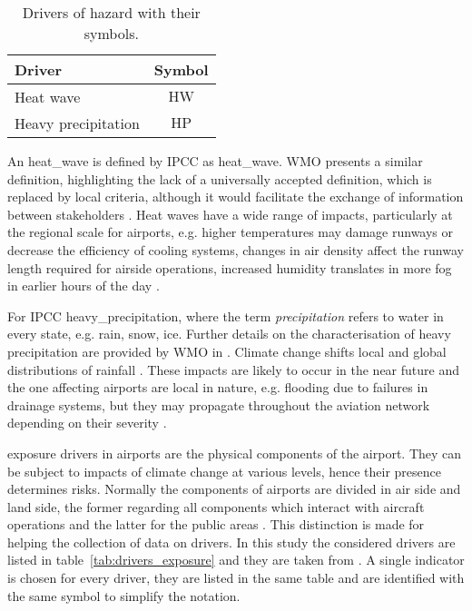 \begin{table}
  \centering
  \caption{Drivers of hazard with their symbols.}
  \label{tab:drivers_hazard}
  \begin{tabular}{lc}
    Driver              & Symbol        \\
    \hline
    Heat wave           & $\mathrm{HW}$ \\
    Heavy precipitation & $\mathrm{HP}$ \\
  \end{tabular}
\end{table}

An \gls{heat_wave} is defined by \gls{IPCC} as \glsdesc{heat_wave}. \Gls{WMO} presents a similar definition, highlighting the lack of a universally accepted definition, which is replaced by local criteria, although it would facilitate the exchange of information between stakeholders \cite[5]{2023WorldMeteorologicalOrganizationWMOGuidelinesOn}. Heat waves have a wide range of impacts, particularly at the regional scale for airports, e.g. higher temperatures may damage runways or decrease the efficiency of cooling systems, changes in air density affect the runway length required for airside operations, increased humidity translates in more fog in earlier hours of the day \cite[23-28]{2018ICAOClimateAdaptation}.

For \gls{IPCC} \glsdesc{heavy_precipitation}, where the term \emph{precipitation} refers to water in every state, e.g. rain, snow, ice. Further details on the characterisation of heavy precipitation are provided by \gls{WMO} in \cite[6-7]{2023WorldMeteorologicalOrganizationWMOGuidelinesOn}. Climate change shifts local and global distributions of rainfall \cite[1605]{2021SeneviratneWeatherAnd}. These impacts are likely to occur in the near future and the one affecting airports are local in nature, e.g. flooding due to failures in drainage systems, but they may propagate throughout the aviation network depending on their severity \cite[28-34]{2018ICAOClimateAdaptation}.

\Gls{exposure} \glspl{driver} in airports are the physical components of the airport. They can be subject to \glspl{impact} of climate change at various levels, hence their presence determines \glspl{risk}. Normally the components of airports are divided in air side and land side, the former regarding all components which interact with aircraft operations and the latter for the public areas \cite[553]{2022DeVivoRiskAssessment}. This distinction is made for helping the collection of data on drivers.
In this study the considered drivers are listed in table~\ref{tab:drivers_exposure} and they are taken from \cite[554]{2022DeVivoRiskAssessment}. A single \gls{indicator} is chosen for every driver, they are listed in the same table and are identified with the same symbol to simplify the notation.

